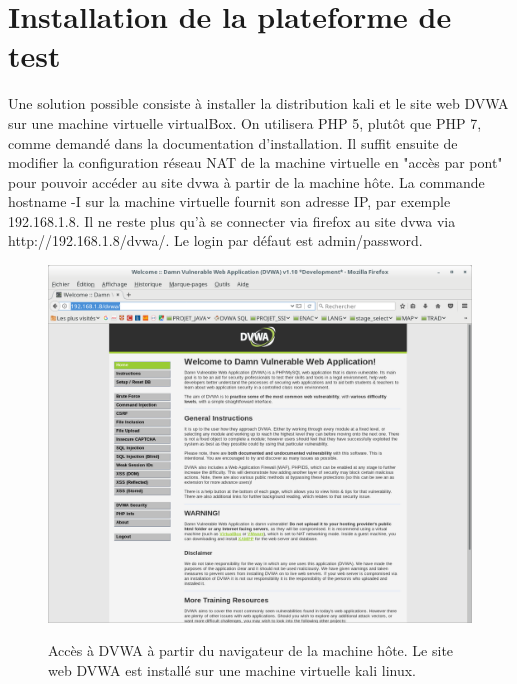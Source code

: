\section{Installation de la plateforme de test}
Une solution possible consiste à installer la distribution kali et le site web DVWA sur une machine virtuelle virtualBox. On utilisera PHP 5, plutôt que PHP 7, comme demandé dans la documentation d'installation.
Il suffit ensuite de modifier la configuration réseau NAT de la machine virtuelle en "accès par pont" pour pouvoir accéder au site dvwa à partir de la machine hôte.
La commande hostname -I sur la machine virtuelle fournit son adresse IP, par exemple 192.168.1.8. Il ne reste plus qu'à se connecter via firefox
au site dvwa via {\color{blue}http://192.168.1.8/dvwa/}. Le login par défaut est admin/password.

 \begin{figure}[!h]
 	\begin{center}
 		\label{}
 		\includegraphics[scale=\scaledvwa]{images/dvwa.png}
 		\caption{Accès à DVWA à partir du navigateur de la machine hôte. Le site web DVWA est installé sur une machine virtuelle kali linux.}
 	\end{center}
 \end{figure}



